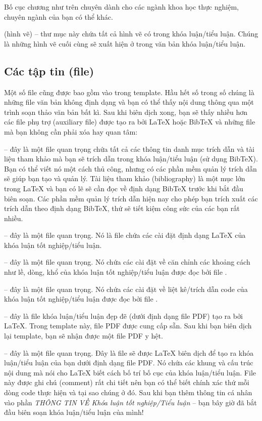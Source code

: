 Bố cục chương như trên chuyên dành cho các ngành khoa học thực nghiệm, chuyên ngành của bạn có thể khác.

 (hình vẽ) -- thư mục này chứa tất cả hình vẽ có trong khóa luận/tiểu luận. Chúng là những hình vẽ cuối cùng sẽ xuất hiện ở trong văn bản khóa luận/tiểu luận.


\subsection{Các tập tin (file)}

Một số file cũng được bao gồm vào trong template. Hầu hết số trong số chúng là những file văn bản không định dạng và bạn có thể thấy nội dung thông qua một trình soạn thảo văn bản bất kì. Sau khi biên dịch xong, bạn sẽ thấy nhiều hơn các file phụ trợ (auxiliary file) được tạo ra bởi \LaTeX{} hoặc BibTeX và những file mà bạn không cần phải xóa hay quan tâm:

 -- đây là một file quan trọng chứa tất cả các thông tin danh mục trích dẫn và tài liệu tham khảo mà bạn sẽ trích dẫn trong khóa luận/tiểu luận (sử dụng BibTeX). Bạn có thể viết nó một cách thủ công, nhưng có các phần mềm quản lý trích dẫn sẽ giúp bạn tạo và quản lý. Tài liệu tham khảo (bibliography) là một mục lớn trong \LaTeX{} và bạn có lẽ sẽ cần đọc về định dạng BibTeX trước khi bắt đầu biên soạn. Các phần mềm quản lý trích dẫn hiện nay cho phép bạn trích xuất các trích dẫn theo định dạng BibTeX, thứ sẽ tiết kiệm công sức của các bạn rất nhiều.

 -- đây là một file quan trọng. Nó là file chứa các cài đặt định dạng \LaTeX{} của khóa luận tốt nghiệp/tiểu luận.

 -- đây là một file quan trọng. Nó chứa các cài đặt về căn chỉnh các khoảng cách như lề, dòng, khổ của khóa luận tốt nghiệp/tiểu luận được đọc bởi file .

 -- đây là một file quan trọng. Nó chứa các cài đặt về liệt kê/trích dẫn code của khóa luận tốt nghiệp/tiểu luận được đọc bởi file .

 -- đây là file khóa luận/tiểu luận đẹp đẽ (dưới định dạng file PDF) tạo ra bởi \LaTeX{}. Trong template này, file PDF được cung cấp sẵn. Sau khi bạn biên dịch lại template, bạn sẽ nhận được một file PDF y hệt.

 -- đây là một file quan trọng. Đây là file sẽ được \LaTeX{} biên dịch để tạo ra khóa luận/tiểu luận của bạn dưới định dạng file PDF. Nó chứa các khung và cấu trúc nội dung mà nói cho \LaTeX{} biết cách bố trí bố cục của khóa luận/tiểu luận. File này được ghi chú (comment) rất chi tiết nên bạn có thể biết chính xác thứ mỗi dòng code thực hiện và tại sao chúng ở đó. Sau khi bạn thêm thông tin cá nhân vào phần \emph{THÔNG TIN VỀ Khóa luận tốt nghiệp/Tiểu luận} -- bạn bây giờ đã bắt đầu biên soạn khóa luận/tiểu luận của mình!

